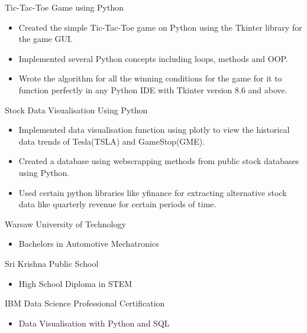 \documentclass{article}
\newlength{\tabin}
\newlength{\secsep}
\newcommand{\lineunder}{\vspace*{-8pt} \\ \hspace*{-6pt} \hrulefill \\ \vspace*{-15pt}}
\newenvironment{tabbedsection}[1]{
  \begin{list}{}{
      \setlength{\itemsep}{0pt}
      \setlength{\labelsep}{0pt}
      \setlength{\labelwidth}{0pt}
      \setlength{\leftmargin}{\tabin}
      \setlength{\rightmargin}{\tabin}
      \setlength{\listparindent}{0pt}
      \setlength{\parsep}{0pt}
      \setlength{\parskip}{0pt}
      \setlength{\partopsep}{0pt}
      \setlength{\topsep}{#1}
    }
  \item[]
}{\end{list}}
\newenvironment{resume_section}[1]{
  \filbreak
  \vspace{2\secsep}
  \textsc{\large#1}
  \lineunder
  \begin{tabbedsection}{\secsep}
}{\end{tabbedsection}}
\newenvironment{resume_subsection}[2][]{
  \textbf{#2} \hfill {\footnotesize #1} \hspace{2em}
  \begin{tabbedsection}{0.5\secsep}
}{\end{tabbedsection}}
\newenvironment{subitems}{
  \renewcommand{\labelitemi}{-}
  \begin{itemize}
      \setlength{\labelsep}{1em}
}{\end{itemize}}
\begin{document}
\begin{resume_section}{\color{violet}{Personal Projects}}
  \begin{resume_subsection}[(November 2022)]{Tic-Tac-Toe Game using Python}
  \begin{subitems}
    \item Created the simple Tic-Tac-Toe game on Python using the Tkinter library for the game GUI.
    \item Implemented several Python concepts including loops, methods and OOP.
    \item Wrote the algorithm for all the winning conditions for the game for it to function perfectly in any Python IDE with Tkinter version 8.6 and above.
    \end{subitems}
  \end{resume_subsection}
  
    \begin{resume_subsection}[(October 2022)]{Stock Data Visualisation Using Python}
  \begin{subitems}
    \item Implemented data visualisation function using plotly to view the historical data trends of Tesla(TSLA) and GameStop(GME).
    \item Created a database using webscrapping methods from public stock databases using Python.
    \item Used certain python libraries like yfinance for extracting alternative stock data like quarterly revenue for certain periods of time.
    \end{subitems}
  \end{resume_subsection}
  \end{resume_section}

\begin{resume_section}{\color{violet}{Education}} \begin{resume_subsection}{Warsaw
University of Technology} \begin{subitems}
\item Bachelors in Automotive Mechatronics \end{subitems}
\end{resume_subsection}
\begin{resume_subsection}{Sri Krishna Public School}
\begin{subitems}
\item High School Diploma in STEM
\end{subitems} \end{resume_subsection}
\end{resume_section}


\begin{resume_section}{\color{violet}{Certification}} \begin{resume_subsection}{IBM Data
Science Professional Certification} \begin{subitems}
\item Data Visualisation with Python and SQL
\end{subitems}
\end{resume_subsection} \end{resume_section}
\end{document}
